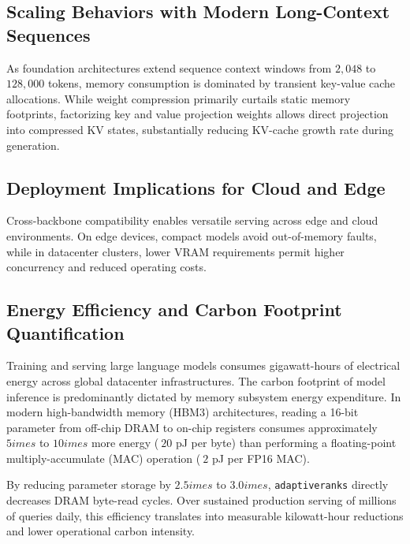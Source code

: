 \subsection{Scaling Behaviors with Modern Long-Context Sequences}
As foundation architectures extend sequence context windows from $2{,}048$ to $128{,}000$ tokens, memory consumption is dominated by transient key-value cache allocations. While weight compression primarily curtails static memory footprints, factorizing key and value projection weights allows direct projection into compressed KV states, substantially reducing KV-cache growth rate during generation.

\subsection{Deployment Implications for Cloud and Edge}
Cross-backbone compatibility enables versatile serving across edge and cloud environments. On edge devices, compact models avoid out-of-memory faults, while in datacenter clusters, lower VRAM requirements permit higher concurrency and reduced operating costs.

\subsection{Energy Efficiency and Carbon Footprint Quantification}
Training and serving large language models consumes gigawatt-hours of electrical energy across global datacenter infrastructures. The carbon footprint of model inference is predominantly dictated by memory subsystem energy expenditure. In modern high-bandwidth memory (HBM3) architectures, reading a 16-bit parameter from off-chip DRAM to on-chip registers consumes approximately $5	imes$ to $10	imes$ more energy ($~20$ pJ per byte) than performing a floating-point multiply-accumulate (MAC) operation ($~2$ pJ per FP16 MAC).

By reducing parameter storage by $2.5	imes$ to $3.0	imes$, \texttt{adaptiveranks} directly decreases DRAM byte-read cycles. Over sustained production serving of millions of queries daily, this efficiency translates into measurable kilowatt-hour reductions and lower operational carbon intensity.
